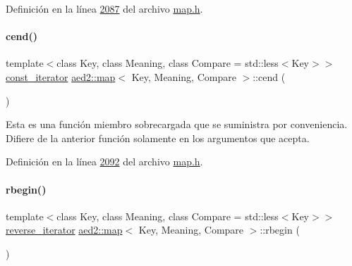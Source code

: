 Definición en la línea \hyperlink{map_8h_source_l02087}{2087} del archivo \hyperlink{map_8h_source}{map.\+h}.

\mbox{\label{classaed2_1_1map_a7bb91e94cbc875f1a011b142ef877912_a7bb91e94cbc875f1a011b142ef877912}} 
\paragraph{\texorpdfstring{cend()}{cend()}}
{\footnotesize\ttfamily template$<$class Key, class Meaning, class Compare = std\+::less$<$\+Key$>$$>$ \\
\hyperlink{classaed2_1_1map_1_1const__iterator}{const\+\_\+iterator} \hyperlink{classaed2_1_1map}{aed2\+::map}$<$ Key, Meaning, Compare $>$\+::cend (\begin{DoxyParamCaption}{ }\end{DoxyParamCaption})\hspace{0.3cm}{\ttfamily [inline]}}

Esta es una función miembro sobrecargada que se suministra por conveniencia. Difiere de la anterior función solamente en los argumentos que acepta. 

Definición en la línea \hyperlink{map_8h_source_l02092}{2092} del archivo \hyperlink{map_8h_source}{map.\+h}.

\mbox{\label{classaed2_1_1map_ac412d3902112122c1bffe2d4283a4e9d_ac412d3902112122c1bffe2d4283a4e9d}} 
\paragraph{\texorpdfstring{rbegin()}{rbegin()}\hspace{0.1cm}{\footnotesize\ttfamily [1/2]}}
{\footnotesize\ttfamily template$<$class Key, class Meaning, class Compare = std\+::less$<$\+Key$>$$>$ \\
\hyperlink{classaed2_1_1map_a8e6a592062260177fd73b2f9897b1dd5_a8e6a592062260177fd73b2f9897b1dd5}{reverse\+\_\+iterator} \hyperlink{classaed2_1_1map}{aed2\+::map}$<$ Key, Meaning, Compare $>$\+::rbegin (\begin{DoxyParamCaption}{ }\end{DoxyParamCaption})\hspace{0.3cm}{\ttfamily [inline]}}



